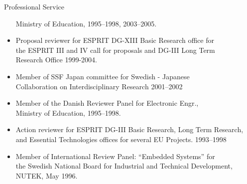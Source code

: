 \documentclass{article}
\begin{document}
\begin{cv}
\begin{cvlist}{Professional Service}
\begin{itemize}
   Ministry of Education, \cftdotfill{\cftdotsep}  1995--1998, 2003--2005.
 \item Proposal reviewer for ESPRIT DG-XIII Basic Research office for\\
   the ESPRIT III and IV call for proposals and DG-III Long Term\\
   Research Office \cftdotfill{\cftdotsep}  1999-2004.
 \item Member of SSF Japan committee for Swedish - Japanese\\
   Collaboration on Interdisciplinary Research \cftdotfill{\cftdotsep}
   2001--2002
 \item Member of the Danish Reviewer Panel for Electronic Engr.,\\
   Ministry of Education, \cftdotfill{\cftdotsep}  1995--1998.
 \item Action reviewer for ESPRIT DG-III Basic Research, Long Term
   Research,\\ and Essential Technologies offices for several EU
   Projects. \cftdotfill{\cftdotsep} 1993--1998
 \item Member of International Review Panel: ``Embedded Systems'' for\\
   the Swedish National Board for Industrial and Technical Development,\\
   NUTEK, \cftdotfill{\cftdotsep} May 1996.
 \end{itemize}
\end{cvlist}


\end{cv}
\end{document}
